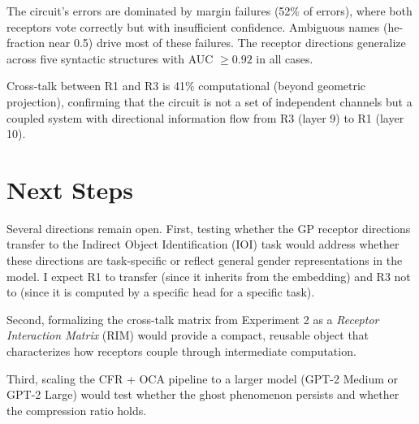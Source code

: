 \documentclass[11pt,a4paper]{article}
\begin{document}
The circuit's errors are dominated by margin failures (52\% of errors), where both receptors vote correctly but with insufficient confidence. Ambiguous names (he-fraction near 0.5) drive most of these failures. The receptor directions generalize across five syntactic structures with AUC $\geq 0.92$ in all cases.

Cross-talk between R1 and R3 is 41\% computational (beyond geometric projection), confirming that the circuit is not a set of independent channels but a coupled system with directional information flow from R3 (layer 9) to R1 (layer 10).


\section{Next Steps}
\label{sec:next}

Several directions remain open. First, testing whether the GP receptor directions transfer to the Indirect Object Identification (IOI) task would address whether these directions are task-specific or reflect general gender representations in the model. I expect R1 to transfer (since it inherits from the embedding) and R3 not to (since it is computed by a specific head for a specific task).

Second, formalizing the cross-talk matrix from Experiment 2 as a \emph{Receptor Interaction Matrix} (RIM) would provide a compact, reusable object that characterizes how receptors couple through intermediate computation.

Third, scaling the CFR + OCA pipeline to a larger model (GPT-2 Medium or GPT-2 Large) would test whether the ghost phenomenon persists and whether the compression ratio holds.
\end{document}
